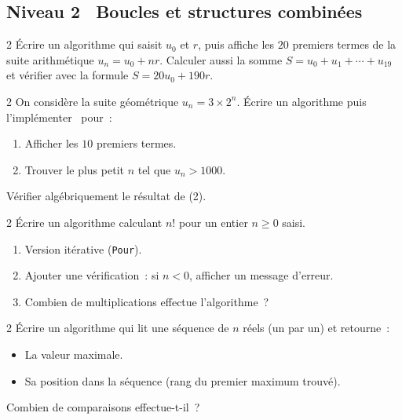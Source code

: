 \subsection*{\quad Niveau 2 \textemdash\ Boucles et structures combin\'ees}

\begin{exo}{2}
\'Ecrire un algorithme qui saisit $u_0$ et $r$, puis affiche les $20$
premiers termes de la suite arithm\'etique $u_n = u_0 + nr$.
Calculer aussi la somme $S = u_0 + u_1 + \cdots + u_{19}$ et v\'erifier
avec la formule $S = 20u_0 + 190r$.
\end{exo}

\begin{exo}{2}
On consid\`ere la suite g\'eom\'etrique $u_n = 3 \times 2^n$.
\'Ecrire un algorithme puis l'impl\'ementer \computer\ pour~:
\begin{enumerate}
  \item Afficher les $10$ premiers termes.
  \item Trouver le plus petit $n$ tel que $u_n > 1000$.
\end{enumerate}
V\'erifier alg\'ebriquement le r\'esultat de (2).
\end{exo}

\begin{exo}{2}
\'Ecrire un algorithme calculant $n!$ pour un entier $n \geq 0$ saisi.
\begin{enumerate}
  \item Version it\'erative (\texttt{Pour}).
  \item Ajouter une v\'erification~: si $n < 0$, afficher un message d'erreur.
  \item Combien de multiplications effectue l'algorithme~?
\end{enumerate}
\end{exo}

\begin{exo}{2}
\'Ecrire un algorithme qui lit une s\'equence de $n$ r\'eels (un par un)
et retourne~:
\begin{itemize}
  \item La valeur maximale.
  \item Sa position dans la s\'equence (rang du premier maximum trouv\'e).
\end{itemize}
Combien de comparaisons effectue-t-il~?
\end{exo}

